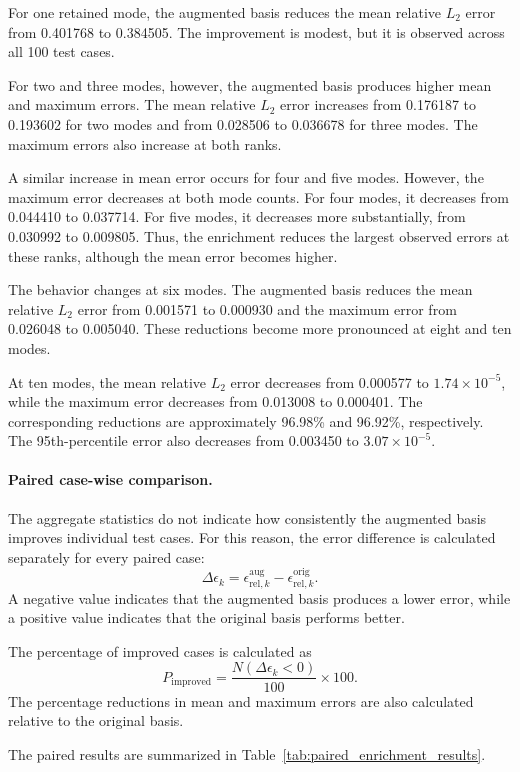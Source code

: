 For one retained mode, the augmented basis reduces
the mean relative $L_2$ error from 0.401768 to
0.384505. The improvement is modest, but it is
observed across all 100 test cases.

For two and three modes, however, the augmented basis
produces higher mean and maximum errors. The mean
relative $L_2$ error increases from 0.176187 to
0.193602 for two modes and from 0.028506 to 0.036678
for three modes. The maximum errors also increase
at both ranks.

A similar increase in mean error occurs for four
and five modes. However, the maximum error decreases
at both mode counts. For four modes, it decreases
from 0.044410 to 0.037714. For five modes, it
decreases more substantially, from 0.030992 to
0.009805. Thus, the enrichment reduces the largest
observed errors at these ranks, although the mean
error becomes higher.

The behavior changes at six modes. The augmented
basis reduces the mean relative $L_2$ error from
0.001571 to 0.000930 and the maximum error from
0.026048 to 0.005040. These reductions become
more pronounced at eight and ten modes.

At ten modes, the mean relative $L_2$ error decreases
from 0.000577 to $1.74\times10^{-5}$, while the
maximum error decreases from 0.013008 to 0.000401.
The corresponding reductions are approximately
96.98\% and 96.92\%, respectively. The 95th-percentile
error also decreases from 0.003450 to
$3.07\times10^{-5}$.

\paragraph{Paired case-wise comparison.}

The aggregate statistics do not indicate how
consistently the augmented basis improves individual
test cases. For this reason, the error difference
is calculated separately for every paired case:
\[
\boxed{
\Delta\epsilon_k
=
\epsilon_{\mathrm{rel},k}^{\mathrm{aug}}
-
\epsilon_{\mathrm{rel},k}^{\mathrm{orig}}.
}
\]
A negative value indicates that the augmented basis
produces a lower error, while a positive value
indicates that the original basis performs better.

The percentage of improved cases is calculated as
\[
P_{\mathrm{improved}}
=
\frac{
N(\Delta\epsilon_k<0)
}{100}
\times100.
\]
The percentage reductions in mean and maximum errors
are also calculated relative to the original basis.

The paired results are summarized in
Table~\ref{tab:paired_enrichment_results}.

